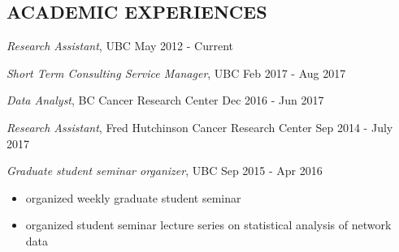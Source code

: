 \documentclass[margin]{res}
\begin{document}
\begin{resume}
 

 
\section{ACADEMIC EXPERIENCES} 

{\sl Research Assistant}, UBC \hfill May 2012 - Current 

{\sl Short Term Consulting Service Manager}, UBC \hfill Feb 2017 - Aug 2017

{\sl Data Analyst}, BC Cancer Research Center
                 \hfill Dec 2016 - Jun 2017 
                

{\sl Research Assistant}, Fred Hutchinson Cancer Research Center 
                 \hfill Sep 2014 - July 2017 


{\sl Graduate student seminar organizer}, UBC \hfill Sep 2015 - Apr 2016
                 \begin{itemize}  \itemsep -2pt %
                  \item organized weekly graduate student seminar
                 \item organized student seminar lecture series on statistical
                 analysis of network data
                \end{itemize}                



\end{resume}
\end{document}
